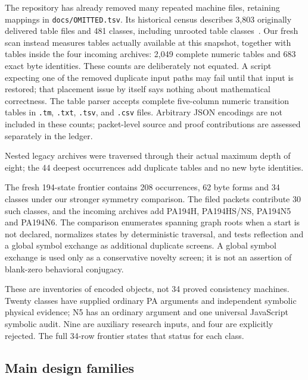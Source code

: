 \documentclass[11pt,letterpaper]{article}
\newcommand{\file}[1]{\nolinkurl{#1}}
\begin{document}
The repository has already removed many repeated machine files, retaining
mappings in \file{docs/OMITTED.tsv}. Its historical census describes 3,803
originally delivered table files and 481 classes, including unrooted table
classes~\cite{census}. Our fresh scan instead measures tables actually
available at this snapshot, together with tables inside the four incoming
archives: 2,049 complete numeric tables and 683 exact byte identities.
These counts are deliberately not equated. A script expecting one of the
removed duplicate input paths may fail until that input is restored; that
placement issue by itself says nothing about mathematical correctness.
The table parser accepts complete five-column numeric transition tables in
\file{.tm}, \file{.txt}, \file{.tsv}, and \file{.csv} files. Arbitrary JSON
encodings are not included in these counts; packet-level source and proof
contributions are assessed separately in the ledger.

Nested legacy archives were traversed through their actual maximum depth of eight; the 44 deepest occurrences add duplicate tables and no new byte identities.

The fresh 194-state frontier contains 208 occurrences, 62 byte forms and 34
classes under our stronger symmetry comparison. The filed packets contribute
30 such classes, and the incoming archives add PA194H, PA194HS/NS, PA194N5
and PA194N6. The comparison enumerates spanning graph roots when a start
is not declared, normalizes states by deterministic traversal, and tests
reflection and a global symbol exchange as additional duplicate screens.
A global symbol exchange is used only as a conservative novelty screen; it
is not an assertion of blank-zero behavioral conjugacy.

These are inventories of encoded objects, not 34 proved consistency
machines. Twenty classes have supplied ordinary PA arguments and independent symbolic
physical evidence; N5 has an ordinary argument and one universal JavaScript
symbolic audit. Nine are auxiliary research inputs, and four are explicitly
rejected.
The full 34-row frontier states that status for each class.

\subsection{Main design families}
\end{document}
